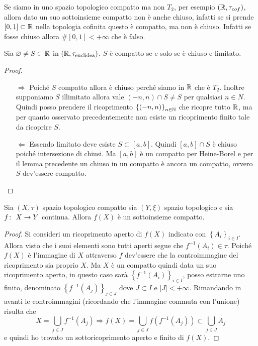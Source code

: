 \begin{remark}
	Se siamo in uno spazio topologico compatto ma non $T_2$, per esempio $(\mathbb{R}, \tau_{cof})$, allora dato un suo sottoinsieme compatto non è anche chiuso, infatti se si prende $\left[0,1\right] \subset \mathbb{R}$ nella topologia cofinita questo è compatto, ma non è chiuso. Infatti se fosse chiuso allora $\#\left[0,1\right] < +\infty$ che è falso.
\end{remark}

\begin{corollary}
	Sia $\varnothing \neq S \subset \mathbb{R}$ in $(\mathbb{R}, \tau_{\text{euclidea}})$. $S$ è compatto se e solo se è chiuso e limitato. 
\end{corollary} 
\begin{proof}
	\begin{enumerate}
		\item[$\Rightarrow$] Poiché $S$ compatto allora è chiuso perché siamo in $\mathbb{R}$ che è $T_2$. Inoltre supponiamo $S$ illimitato allora vale $(-n, n) \cap S \neq S$ per qualsiasi $n \in N$. Quindi posso prendere il ricoprimento $\left\{(-n,n)\right\}_{n\in \mathbb{N}}$ che ricopre tutto $\mathbb{R}$, ma per quanto osservato precedentemente non esiste un ricoprimento finito tale da ricoprire $S$.
		\item[$\Leftarrow$] Essendo limitato deve esiste $S\subset \left[a,b\right]$. Quindi $\left[a,b\right] \cap S$ è chiuso poiché intersezione di chiusi. Ma $\left[a,b\right]$ è un compatto per Heine-Borel e per il lemma precedente un chiuso in un compatto è ancora un compatto, ovvero $S$ dev'essere compatto.
	\end{enumerate}	
\end{proof}

\begin{theorem}
	Sia $(X, \tau)$ spazio topologico compatto sia $(Y, \xi)$ spazio topologico e sia $f \colon\ X \rightarrow Y$ continua. Allora $f(X)$ è un sottoinsieme compatto. 
\end{theorem} 
\begin{proof}
	Si consideri un ricoprimento aperto di $f(X)$ indicato con $\left\{A_i\right\}_{i \in I}$. Allora visto che i suoi elementi sono tutti aperti segue che $f^{-1}(A_i) \in \tau$. Poiché $f(X)$ è l'immagine di $X$ attraverso $f$ dev'essere che la controimmagine del ricoprimento sia proprio $X$. Ma $X$ è un compatto quindi data un suo ricoprimento aperto, in questo caso sarà $\left\{f^{-1}(A_i)\right\}_{i \in I}$, posso estrarne uno finito, denominato $\left\{f^{-1}(A_j)\right\}_{j \in J}$ dove $J \subset I$ e $|J| < +\infty$. Rimandando in avanti le controimmagini (ricordando che l'immagine commuta con l'unione) risulta che
	\begin{equation*}
		X = \bigcup_{j \in J} f^{-1}(A_j) \Longrightarrow f(X) = \bigcup_{j \in J} f(f^{-1}(A_j)) \subset \bigcup_{j \in J} A_j
	\end{equation*}
	e quindi ho trovato un sottoricoprimento aperto e finito di $f(X)$.
\end{proof}

